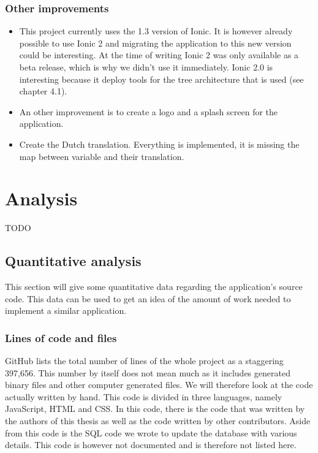 \documentclass{eplmastersthesis}
\begin{document}
\subsection{Other improvements}
\begin{itemize}
\item This project currently uses the 1.3 version of Ionic. It is however already possible to use Ionic 2 and migrating the application to this new version could be interesting. At the time of writing Ionic 2 was only available as a beta release, which is why we didn't use it immediately. Ionic 2.0 is interesting because it deploy tools for the tree architecture that is used (see chapter 4.1).
\item An other improvement is to create a logo and a splash screen for the application.
\item Create the Dutch translation. Everything is implemented, it is missing the map between variable and their translation.
\end{itemize}



\chapter{Analysis}

TODO

\section{Quantitative analysis}

This section will give some quantitative data regarding the application's source code. This data can be used to get an idea of the amount of work needed to implement a similar application.

\subsection{Lines of code and files}

GitHub lists the total number of lines of the whole project as a staggering 397,656. This number by itself does not mean much as it includes generated binary files and other computer generated files. We will therefore look at the code actually written by hand. This code is divided in three languages, namely JavaScript, HTML and CSS. In this code, there is the code that was written by the authors of this thesis as well as the code written by other contributors. Aside from this code is the SQL code we wrote to update the database with various details. This code is however not documented and is therefore not listed here.
\end{document}
